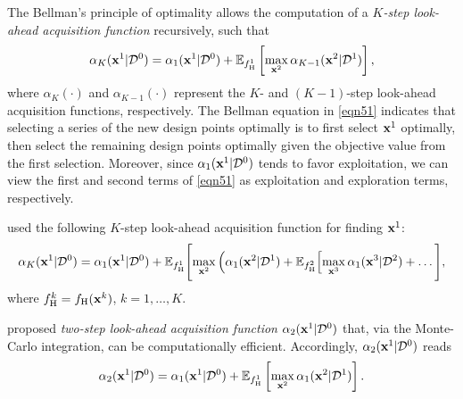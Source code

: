 \documentclass[journal ]{new-aiaa}
\begin{document}
	The Bellman's principle of optimality allows the computation of a \textit{$K$-step look-ahead acquisition function} recursively, such that~\citep{Bellman1952}
	\begin{equation}\label{eqn51}
		\alpha_K({\bf x}^1|\mathcal{D}^0)
		=\alpha_1({\bf x}^1|\mathcal{D}^0) + \mathbb{E}_{f^1_\text{H}}\left[\underset{{\bf x}^2}{\max}\,\alpha_{K-1}({\bf x}^2|\mathcal{D}^1)\right],
	\end{equation}
	where $\alpha_K(\cdot)$ and $\alpha_{K-1}(\cdot)$ represent the $K$- and $(K-1)$-step look-ahead acquisition functions, respectively.
	The Bellman equation in \cref{eqn51} indicates that selecting a series of the new design points optimally is to first select ${\bf x}^1$ optimally, then select the remaining design points optimally given the objective value from the first selection.
	Moreover, since $\alpha_1({\bf x}^1|\mathcal{D}^0)$ tends to favor exploitation, we can view the first and second terms of \cref{eqn51} as exploitation and exploration terms, respectively.
	
	\citet{Jiang2020} used the following $K$-step look-ahead acquisition function for finding ${\bf x}^1$:
	\begin{equation}\label{eqn52}
		\alpha_K({\bf x}^1|\mathcal{D}^0) = \alpha_1({\bf x}^1|\mathcal{D}^0) +\mathbb{E}_{f_\text{H}^1}\Bigg[\underset{{\bf x}^2}{\max}\,\Big(\alpha_1({{\bf x}}^2|\mathcal{D}^1) + 
		\mathbb{E}_{f_\text{H}^2}\Big[\underset{{\bf x}^3}{\max}\,\alpha_1({\bf x}^3|\mathcal{D}^2)+\dots  \Bigg],
	\end{equation}
	where $f^k_\text{H} = f_\text{H}({\bf x}^k)$, $k=1,\dots,K$.
	
	\citet{WuJ2019} proposed \textit{two-step look-ahead acquisition function} $\alpha_2({\bf x}^1|\mathcal{D}^0)$ that, via the Monte-Carlo integration, can be computationally efficient.
	Accordingly, $\alpha_2({\bf x}^1|\mathcal{D}^0)$ reads
	\begin{equation}\label{eqn53}
		\alpha_2({\bf x}^1|\mathcal{D}^0) =\alpha_1({\bf x}^1|\mathcal{D}^0) + \mathbb{E}_{f^1_\text{H}}\left[\underset{{\bf x}^2}{\max}\,\alpha_1({\bf x}^2|\mathcal{D}^1)\right].
	\end{equation}
	
\end{document}
